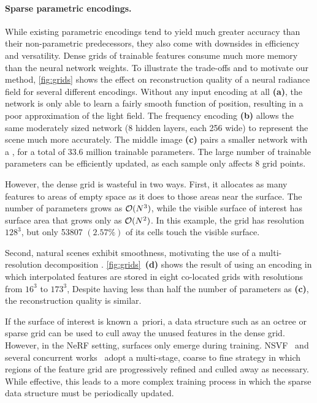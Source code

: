 \documentclass[acmtog,authorversion]{acmart}
\begin{document}
\paragraph{Sparse parametric encodings.}
While existing parametric encodings tend to yield much greater accuracy than their non-parametric predecessors, they also come with downsides in efficiency and versatility. Dense grids of trainable features consume much more memory than the neural network weights. To illustrate the trade-offs and to motivate our method, \autoref{fig:grids} shows the effect on reconstruction quality of a neural radiance field for several different encodings. Without any input encoding at all \textbf{(a)}, the network is only able to learn a fairly smooth function of position, resulting in a poor approximation of the light field. The frequency encoding \textbf{(b)} allows the same moderately sized network (8 hidden layers, each 256 wide) to represent the scene much more accurately. The middle image \textbf{(c)} pairs a smaller network with a , for a total of 33.6 million trainable parameters. The large number of trainable parameters can be efficiently updated, as each sample only affects 8 grid points. 

However, the dense grid is wasteful in two ways. First, it allocates as many features to areas of empty space as it does to those areas near the surface.
The number of parameters grows as $\mathcal{O}(N^3)$, while the visible surface of interest has surface area that grows only as $\mathcal{O}(N^2)$.
In this example, the grid has resolution $128^3$, but only \num{53807} $(2.57\%)$ of its cells touch the visible surface. 

Second, natural scenes exhibit smoothness, motivating the use of a multi-resolution decomposition \cite{hadadan2021, chibane2020}.
\autoref{fig:grids}~\textbf{(d)} shows the result of using an encoding in which interpolated features 
are stored in eight co-located grids with resolutions from $16^3$ to $173^3$, 
Despite having less than half the number of parameters as \textbf{(c)}, the reconstruction quality is similar.

If the surface of interest is known a~priori, a data structure such as an octree \cite{takikawa2021nglod} or sparse grid \cite{liu2020neural,chabra2020,chiyu2020,peng2020,hadadan2021,chibane2020} can be used to cull away the unused features in the dense grid.
However, in the NeRF setting, surfaces only emerge during training.
NSVF~\cite{liu2020neural} and several concurrent works~\citep{yu2021plenoxels,sun2021direct} adopt a multi-stage, coarse to fine strategy in which regions of the feature grid are progressively refined and culled away as necessary.
While effective, this leads to a more complex training process in which the sparse data structure must be periodically updated.
\end{document}

